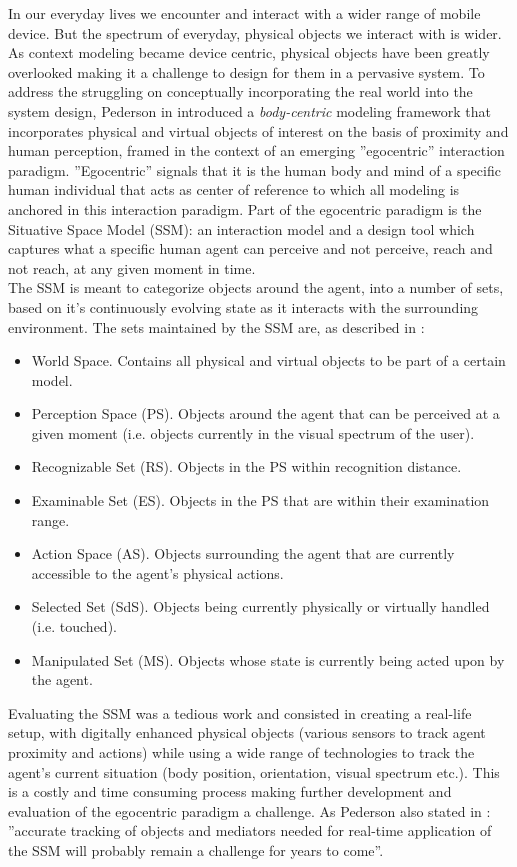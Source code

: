 In our everyday lives we encounter and interact with a wider range of mobile device. But the spectrum of everyday, physical objects we interact with is wider. As context modeling became device centric, physical objects have been greatly overlooked making it a challenge to design for them in a pervasive system. To address the struggling on conceptually incorporating the real world into the system design, Pederson in \cite{pederson2010towards} introduced a \emph{body-centric} modeling framework that incorporates physical and virtual objects of interest on the basis of proximity and human perception, framed in the context of an emerging ''egocentric'' interaction paradigm. ''Egocentric'' signals that it is the human body and mind of a specific human individual that acts as center of reference to which all modeling is anchored in this interaction paradigm. Part of the egocentric paradigm is the Situative Space Model (SSM): an interaction model and a design tool which captures what a specific human agent can perceive and not perceive, reach and not reach, at any given moment in time.\\

The SSM is meant to categorize objects around the agent, into a number of sets, based on it's continuously evolving state as it interacts with the surrounding environment. The sets maintained by the SSM are, as described in \cite{pederson2010towards}:
\begin{itemize}
	\item World Space. Contains all physical and virtual objects to be part of a certain model.
	\item Perception Space (PS). Objects around the agent that can be perceived at a given moment (i.e. objects currently in the visual spectrum of the user).
	\item Recognizable Set (RS). Objects in the PS within recognition distance.
	\item Examinable Set (ES). Objects in the PS that are within their examination range.
	\item Action Space (AS). Objects surrounding the agent that are currently accessible to the agent's physical actions.
	\item Selected Set (SdS). Objects being currently physically or virtually handled (i.e. touched).
	\item Manipulated Set (MS). Objects whose state is currently being acted upon by the agent.
\end{itemize}

Evaluating the SSM was a tedious work and consisted in creating a real-life setup, with digitally enhanced physical objects (various sensors to track agent proximity and actions) while using a wide range of technologies to track the agent's current situation (body position, orientation, visual spectrum etc.). This is a costly and time consuming process making further development and evaluation of the egocentric paradigm a challenge. As Pederson also stated in \cite{pederson2011situative}: ''accurate tracking of objects and mediators needed for real-time application of the SSM will probably remain a challenge for years to come''.\\

